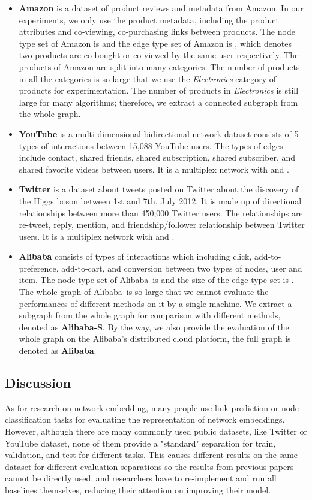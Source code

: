 \documentclass[sigconf]{acmart}
\newcommand{\company}{Alibaba}
\begin{document}
\begin{itemize}
    \item \textbf{Amazon} is a dataset of product reviews and metadata from Amazon. In our experiments, we only use the product metadata, including the product attributes and co-viewing, co-purchasing links between products. The node type set of Amazon is  and the edge type set of Amazon is , which denotes two products are co-bought or co-viewed by the same user respectively. The products of Amazon are split into many categories. The number of products in all the categories is so large that we use the \textit{Electronics} category of products for experimentation. The number of products in \textit{Electronics} is still large for many algorithms; therefore, we extract a connected subgraph from the whole graph. 
    \item \textbf{YouTube} is a multi-dimensional bidirectional network dataset consists of 5 types of interactions between 15,088 YouTube users. The types of edges include contact, shared friends, shared subscription, shared subscriber, and shared favorite videos between users. It is a multiplex network with  and .
    \item \textbf{Twitter} is a dataset about tweets posted on Twitter about the discovery of the Higgs boson between 1st and 7th, July 2012. It is made up of  directional relationships between more than 450,000 Twitter users. The relationships are re-tweet, reply, mention, and friendship/follower relationship between Twitter users. It is a multiplex network with  and .
    \item \textbf{\company} consists of  types of interactions which including click, add-to-preference, add-to-cart, and conversion between two types of nodes, user and item. The node type set of \company\ is  and the size of the edge type set is . The whole graph of \company\ is so large that we cannot evaluate the performances of different methods on it by a single machine. We extract a subgraph from the whole graph for comparison with different methods, denoted as \textbf{\company-S}. By the way, we also provide the evaluation of the whole graph on the \company's distributed cloud platform, the full graph is denoted as \textbf{\company}.
\end{itemize}


\subsection{Discussion}

As for research on network embedding, many people use link prediction or node classification tasks for evaluating the representation of network embeddings. However, although there are many commonly used public datasets, like Twitter or YouTube dataset, none of them provide a "standard" separation for train, validation, and test for different tasks. This causes different results on the same dataset for different evaluation separations so the results from previous papers cannot be directly used, and researchers have to re-implement and run all baselines themselves, reducing their attention on improving their model.
\end{document}
